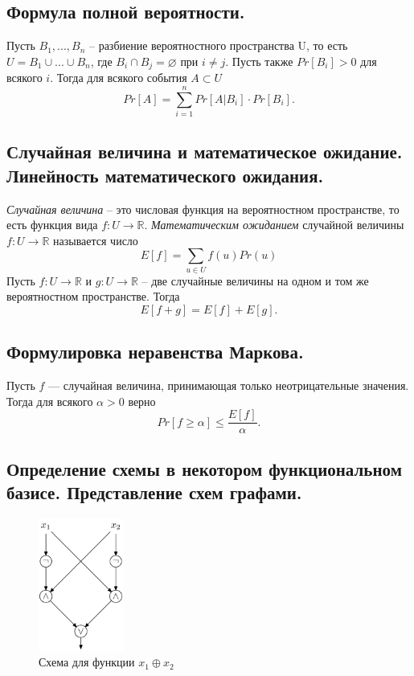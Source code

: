 \documentclass{article}
\begin{document}
\subsection{Формула полной вероятности.}
Пусть $B_1,...,B_n$ -- разбиение вероятностного пространства U, то есть $U = B_1 \cup ... \cup B_n$, где $B_i \cap B_j = \varnothing$ при $i \neq j$. Пусть также $Pr[B_i] > 0$ для всякого $i$. Тогда для всякого события $A \subset U$
\[
Pr[A] = \sum_{i=1}^n Pr[A | B_i] \cdot Pr[B_i].
\]




\subsection{Случайная величина и математическое ожидание. Линейность математического ожидания.}
\textit{Случайная величина} -- это числовая функция на вероятностном пространстве, то есть функция вида $f : U \to \mathbb{R}$.
\newline
\newline
\textit{Математическим ожиданием} случайной величины $f : U \to \mathbb{R}$ называется число
\[
E[f] = \sum_{u \in U} f(u)Pr(u)
\]
\newline
Пусть $f : U \to \mathbb{R}$ и $g : U \to \mathbb{R}$ -- две случайные величины на одном и том же вероятностном пространстве. Тогда
\[
E[f + g] = E[f] + E[g]. 
\]



\subsection{Формулировка неравенства Маркова.}
Пусть $f$ — случайная величина, принимающая только неотрицательные значения. Тогда для всякого $\alpha > 0$ верно
\[
Pr[f \geqslant \alpha] \leqslant \frac{E[f]}{\alpha}.
\]

\subsection{Определение схемы в некотором функциональном базисе. Представление схем графами.}
\begin{figure}
    \centering
    \includegraphics[width=0.25\textwidth]{graph}
    \caption{Схема для функции $x_1 \oplus x_2$}
\end{figure}
\end{document}
